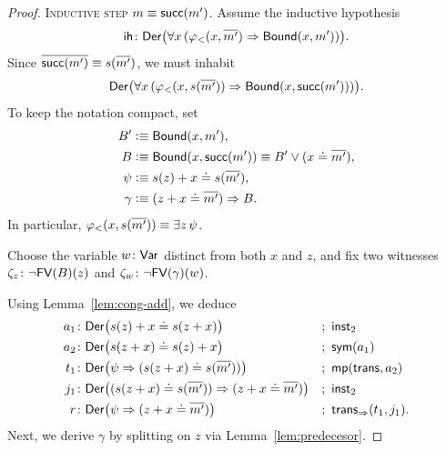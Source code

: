 \begin{proof}
    \textsc{Inductive step $m\equiv\mathsf{succ}(m')$.} Assume the inductive hypothesis
    \[
        \fun{ih}\colon\fun{Der}\bigl(
            \forall x\,(\varphi_{<}(x,\num{m'})\imp\fun{Bound}(x,m'))
        \bigr).
    \]
    Since ${\overline{\mathsf{succ}(m')}}\equiv s({\overline{m'}})$, we must inhabit
    \[
        \mathsf{Der}\bigl(
            \forall x\,(\varphi_{<}(x,s({\overline{m'}}))\mathrel{\Rightarrow}\mathsf{Bound}(x,\mathsf{succ}(m')))
        \bigr).
    \]
    To keep the notation compact, set
    \begin{align*}
        B'&\mathrel{\vcentcolon}\equiv\mathsf{Bound}(x,m'),\\
        B&\mathrel{\vcentcolon}\equiv\mathsf{Bound}(x,\mathsf{succ}(m'))\equiv B'\lor(x\doteq{\overline{m'}}),\\
        \psi&\mathrel{\vcentcolon}\equiv s(z)+x\doteq s({\overline{m'}}),\\
        \gamma&\mathrel{\vcentcolon}\equiv(z+x\doteq{\overline{m'}})\mathrel{\Rightarrow} B.
    \end{align*}
    In particular, $\varphi_{<}(x,s({\overline{m'}}))\equiv\exists z\,\psi$.
    
    Choose the variable $w\colon\fun{Var}$ distinct from both $x$ and $z$, and fix two witnesses $\zeta_z\colon\neg\fun{FV}(B)(z)$ and $\zeta_w\colon\neg\fun{FV}(\gamma)(w)$.

    Using Lemma~\ref{lem:cong-add}, we deduce
    \begin{align*}
        a_1&\colon\fun{Der}\bigl(s(z)+x\doteq s(z+x)\bigr)
            &&;\ \fun{inst}_2\\
        a_2&\colon\fun{Der}\bigl(s(z+x)\doteq s(z)+x\bigr)
            &&;\ \fun{sym}(a_1)\\
        t_1&\colon\fun{Der}\bigl(\psi\imp(s(z+x)\doteq s(\num{m'}))\bigr)
            &&;\ \fun{mp}(\fun{trans},a_2)\\
        j_1&\colon\fun{Der}\bigl((s(z+x)\doteq s(\num{m'}))\imp(z+x\doteq\num{m'})\bigr)
            &&;\ \fun{inst}_2\\
        r&\colon\fun{Der}\bigl(\psi\imp(z+x\doteq\num{m'})\bigr)
            &&;\ \fun{trans}_{\imp}(t_1,j_1).
    \end{align*}
    Next, we derive $\gamma$ by splitting on $z$ via Lemma~\ref{lem:predecesor}.


\end{proof}
